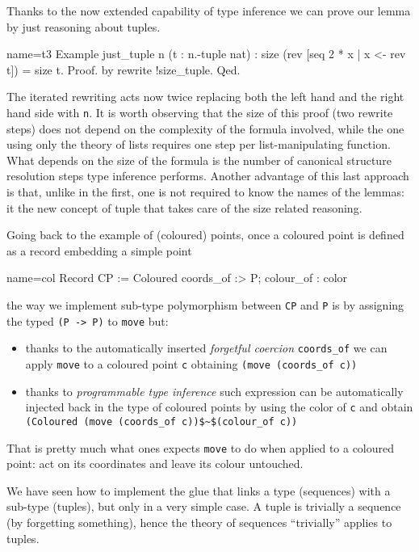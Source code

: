 Thanks to the now extended capability of type inference
we can prove our lemma by just reasoning about tuples.

\begin{coq}{name=t3}{}
Example just_tuple n (t : n.-tuple nat) :
  size (rev [seq 2 * x | x <- rev t]) = size t.
Proof. by rewrite !size_tuple. Qed.
\end{coq}

The iterated rewriting acts now twice replacing both the left hand
and the right hand side with \lstinline/n/.  It is worth observing
that the size of this proof (two rewrite steps) does not depend on the
complexity of the formula involved, while the one using only the
theory of lists requires one step per list-manipulating function.
What depends on the size of the formula is the number of canonical
structure resolution steps type inference performs.  Another advantage
of this last approach is that, unlike in the first, one
is not required to know the names of the lemmas:
it the new concept of tuple that takes care of the size related
reasoning.

Going back to the example of (coloured) points, once a coloured point
is defined as a record embedding a simple point

\begin{coq}{name=col}{}
Record CP := Coloured { coords_of :> P; colour_of : color }
\end{coq}

\noindent
the way we implement sub-type polymorphism between \lstinline/CP/
and \lstinline/P/ is by assigning the typed \lstinline/(P -> P)/ to
\lstinline/move/ but:
\begin{itemize}
\item thanks to the automatically inserted
	\emph{forgetful coercion} \lstinline/coords_of/
	we can apply \lstinline/move/ to a coloured point \lstinline/c/
	obtaining \lstinline/(move (coords_of c))/
\item thanks to \emph{programmable type inference} such	expression
	can be automatically injected back in the type of coloured
	points by using the color of \lstinline/c/ and obtain
	\lstinline/(Coloured (move (coords_of c))$~$(colour_of c))/
\end{itemize}
That is pretty much what ones expects \lstinline/move/ to do when
applied to a coloured point: act on its coordinates and leave
its colour untouched.

We have seen how to implement the glue that links a type (sequences)
with a sub-type (tuples), but only in a very simple case.
A tuple is trivially a sequence (by forgetting something), hence the
theory of sequences ``trivially'' applies to tuples.

